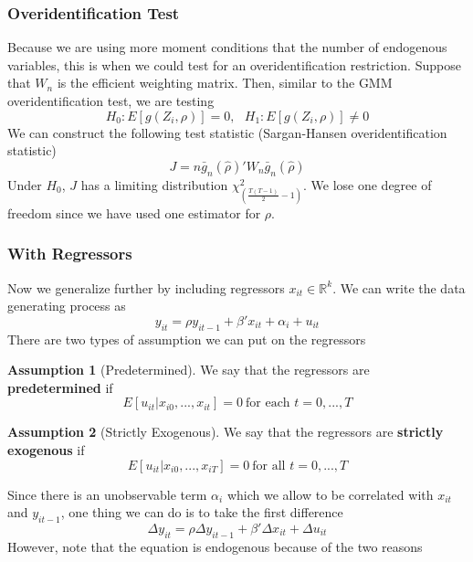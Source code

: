 \documentclass[12pt]{article}
\theoremstyle{definition}
\theoremstyle{property}
\theoremstyle{assumption}
\newtheorem{assumption}{Assumption}[section]
\theoremstyle{example}
\theoremstyle{comment}
\begin{document}
\subsubsection{Overidentification Test}
Because we are using more moment conditions that the number of endogenous variables, this is when we could test for an overidentification restriction. Suppose that $W_n$ is the efficient weighting matrix. Then, similar to the GMM overidentification test, we are testing
\[
H_0: E[g(Z_i,\rho)]=0, \ \ \ H_1: E[g(Z_i,\rho)]\neq0
\]
We can construct the following test statistic (Sargan-Hansen overidentification statistic)
\[
J= n \bar{g}_n(\hat{\rho})'W_n\bar{g}_n(\hat{\rho})
\]
Under $H_0$, $J$ has a limiting distribution $\chi^2_{\left(\frac{T(T-1)}{2}-1\right)}$. We lose one degree of freedom since we have used one estimator for $\rho$. 
\subsubsection{With Regressors}
Now we generalize further by including regressors $x_{it}\in\mathbb{R}^k$. We can write the data generating process as
\[
y_{it}=\rho y_{it-1}+\beta'x_{it}+\alpha_i + u_{it}
\]
There are two types of assumption we can put on the regressors
\begin{mdframed}[backgroundcolor=blue!5] 
\begin{assumption}[Predetermined]
We say that the regressors are \textbf{predetermined} if
\[
E[u_{it}|x_{i0},...,x_{it}]=0 \ \text{for each } t=0,...,T
\]
\end{assumption}
\begin{assumption}[Strictly Exogenous]
We say that the regressors are \textbf{strictly exogenous} if
\[
E[u_{it}|x_{i0},...,x_{iT}]=0 \ \text{for all } t=0,...,T
\]
\end{assumption}
\end{mdframed}
Since there is an unobservable term $\alpha_i$ which we allow to be correlated with $x_{it}$ and $y_{it-1}$, one thing we can do is to take the first difference
\[
\Delta y_{it}=\rho \Delta y_{it-1}+\beta'\Delta x_{it}+\Delta  u_{it}
\]
However, note that the equation is endogenous because of the two reasons
\end{document}
